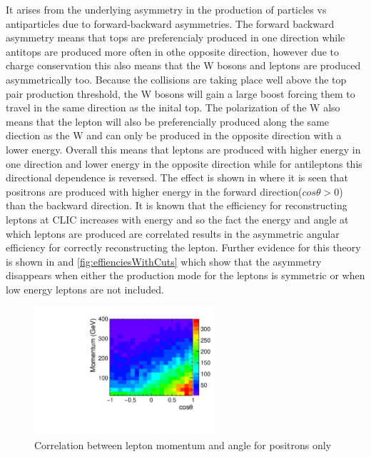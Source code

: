 It arises from the underlying asymmetry in the production of particles vs antiparticles due to forward-backward asymmetries. The forward backward asymmetry means that tops are preferencialy produced in one direction while antitops are produced more often in othe opposite direction, however due to charge conservation this also means that the W bosons and leptons are produced asymmetrically too. Because the collisions are taking place well above the top pair production threshold, the W bosons will gain a large boost forcing them to travel in the same direction as the inital top. The polarization of the W also means that the lepton will also be preferencially produced along the same diection as the W and can only be produced in the opposite direction with a lower energy. Overall this means that leptons are produced with higher energy in one direction and lower energy in the opposite direction while for antileptons this directional dependence is reversed. The effect is shown in  where it is seen that positrons are produced with higher energy in the forward direction($cos\theta>0$) than the backward direction. It is known that the efficiency for reconstructing leptons at CLIC increases with energy and so the fact the energy and angle at which leptons are produced are correlated results in the asymmetric angular efficiency for correctly reconstructing the lepton. Further evidence for this theory is shown in  and \ref{fig:effienciesWithCuts} which show that the asymmetry disappears when either the production mode for the leptons is symmetric or when low energy leptons are not included.

\begin{figure}
  \centering
  \includegraphics[width=0.6\textwidth]{TopAnalysis/figures/MomentumVsTheta.pdf}
  \caption[Lepton Momentum Vs Angle]{Correlation between lepton momentum and angle for positrons only}
  \label{fig:efficiency2d}
\end{figure}


